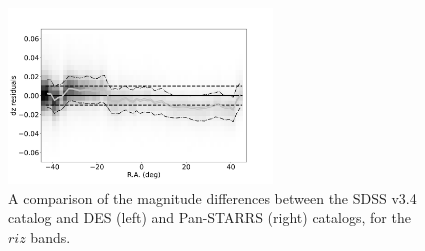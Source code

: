 \begin{figure}[th!]
    \centering\includegraphics[width=7cm]{figures/colorResidPSDR2bright_dz_RA_Hess.png}
\caption{A comparison of the magnitude differences between the SDSS v3.4 catalog
and DES (left) and Pan-STARRS (right) catalogs, for the $riz$ bands.}
\label{fig:DESPSRA}
\end{figure}

